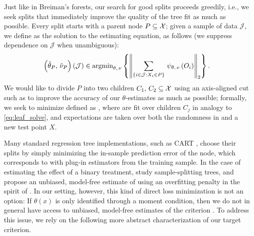 \documentclass[aos]{imsart}
\theoremstyle{plain}
\theoremstyle{definition}
\theoremstyle{remark}
\begin{document}
\begin{CJK}{UTF8}{gbsn}
{Just like in Breiman's forests, our search for good splits proceeds greedily, i.e., we seek splits that
immediately improve the quality of the tree fit as much as possible.
Every split starts with a parent node $P \subseteq \mathcal{X}$; given a sample of data $\mathcal{J}$, we define
 as the solution to the estimating equation, as follows
(we suppress dependence on $\mathcal{J}$ when unambiguous):
\begin{equation}
\label{eq:leaf_solve}
\p{\htheta_P, \, \hnu_P}(\mathcal{J}) \in \argmin_{\theta, \, \nu} \cb{\Norm{\sum_{\cb{i\in\mathcal{J} : X_i \in P}} \, \psi_{\theta, \, \nu}\p{O_i}}_2}.
\end{equation}
We would like to divide $P$ into two children $C_1, \, C_2 \subseteq \mathcal{X}$ using an axis-aligned
cut such as to improve the accuracy of our $\theta$-estimates as much as possible;
formally, we seek to minimize  defined as
 ,
where  are fit over children $C_j$ in analogy to \eqref{eq:leaf_solve},
and expectations are taken over both the randomness in  and a
new test point $X$.

Many standard regression tree implementations, such as CART \citep{breiman1984classification},
choose their splits by simply minimizing the in-sample prediction error of the node, which corresponds to 
 with plug-in estimators from the training sample. 
In the case of estimating the effect of a binary treatment,
\citet{athey2016recursive} study sample-splitting trees, and
propose an unbiased, model-free estimate of   using
an overfitting penalty in the spirit of \citet{mallows1973some}.
In our setting, however, this kind of direct loss minimization is not an option: If $\theta(x)$ is only
identified through a moment condition, then we do not in general have access to unbiased,
model-free estimates of the criterion  . To address this issue, we
rely on the following more abstract characterization of our target criterion. 

}
\end{CJK}
\end{document}
